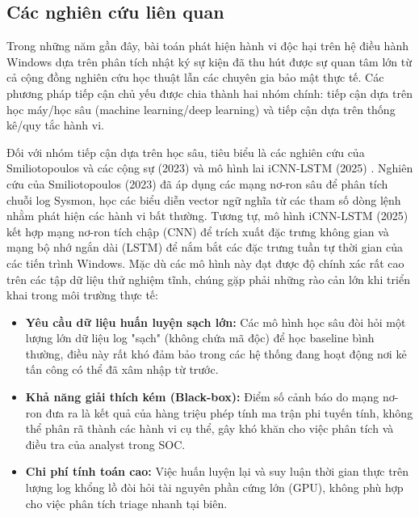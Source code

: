 \documentclass[../main.tex]{subfiles}
\begin{document}
\subsection{Các nghiên cứu liên quan}
Trong những năm gần đây, bài toán phát hiện hành vi độc hại trên hệ điều hành Windows dựa trên phân tích nhật ký sự kiện đã thu hút được sự quan tâm lớn từ cả cộng đồng nghiên cứu học thuật lẫn các chuyên gia bảo mật thực tế. Các phương pháp tiếp cận chủ yếu được chia thành hai nhóm chính: tiếp cận dựa trên học máy/học sâu (machine learning/deep learning) và tiếp cận dựa trên thống kê/quy tắc hành vi.

Đối với nhóm tiếp cận dựa trên học sâu, tiêu biểu là các nghiên cứu của Smiliotopoulos và các cộng sự (2023) \cite{smiliotopoulos2023} và mô hình lai iCNN-LSTM (2025) \cite{icnnlstm2025}. Nghiên cứu của Smiliotopoulos (2023) \cite{smiliotopoulos2023} đã áp dụng các mạng nơ-ron sâu để phân tích chuỗi log Sysmon, học các biểu diễn vector ngữ nghĩa từ các tham số dòng lệnh nhằm phát hiện các hành vi bất thường. Tương tự, mô hình iCNN-LSTM (2025) \cite{icnnlstm2025} kết hợp mạng nơ-ron tích chập (CNN) để trích xuất đặc trưng không gian và mạng bộ nhớ ngắn dài (LSTM) để nắm bắt các đặc trưng tuần tự thời gian của các tiến trình Windows. Mặc dù các mô hình này đạt được độ chính xác rất cao trên các tập dữ liệu thử nghiệm tĩnh, chúng gặp phải những rào cản lớn khi triển khai trong môi trường thực tế:
\begin{itemize}
    \item \textbf{Yêu cầu dữ liệu huấn luyện sạch lớn:} Các mô hình học sâu đòi hỏi một lượng lớn dữ liệu log "sạch" (không chứa mã độc) để học baseline bình thường, điều này rất khó đảm bảo trong các hệ thống đang hoạt động nơi kẻ tấn công có thể đã xâm nhập từ trước.
    \item \textbf{Khả năng giải thích kém (Black-box):} Điểm số cảnh báo do mạng nơ-ron đưa ra là kết quả của hàng triệu phép tính ma trận phi tuyến tính, không thể phân rã thành các hành vi cụ thể, gây khó khăn cho việc phân tích và điều tra của analyst trong SOC.
    \item \textbf{Chi phí tính toán cao:} Việc huấn luyện lại và suy luận thời gian thực trên lượng log khổng lồ đòi hỏi tài nguyên phần cứng lớn (GPU), không phù hợp cho việc phân tích triage nhanh tại biên.
\end{itemize}
\end{document}
